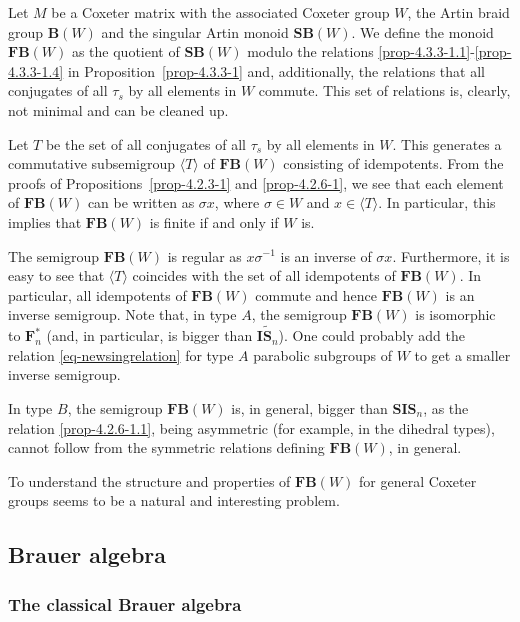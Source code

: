 \documentclass[a4paper]{amsart}
\begin{document}
Let $M$ be a Coxeter matrix with the associated Coxeter group $W$, 
the Artin braid group $\mathbf{B}(W)$ and the singular Artin monoid $\mathbf{SB}(W)$.
We define the monoid $\mathbf{FB}(W)$ as the quotient of $\mathbf{SB}(W)$
modulo the relations  \eqref{prop-4.3.3-1.1}-\eqref{prop-4.3.3-1.4} in
Proposition~\ref{prop-4.3.3-1}
and, additionally, the relations that all conjugates of all $\tau_s$ by
all elements in $W$ commute. This set of relations is, clearly, not minimal
and can be cleaned up.

Let $T$ be the set of all conjugates of all $\tau_s$ by all elements in $W$.
This generates a commutative subsemigroup $\langle T\rangle$ of 
$\mathbf{FB}(W)$ consisting of idempotents. From the proofs of 
Propositions~\ref{prop-4.2.3-1} and \ref{prop-4.2.6-1}, we see that 
each element of $\mathbf{FB}(W)$ can be written as $\sigma x$,
where $\sigma\in W$ and $x\in \langle T\rangle$. In particular, this
implies that $\mathbf{FB}(W)$ is finite if and only if $W$ is.

The semigroup $\mathbf{FB}(W)$ is regular as $x \sigma^{-1}$ is
an inverse of $\sigma x$. Furthermore, it is easy to see that
$\langle T\rangle$ coincides with the set of all idempotents of $\mathbf{FB}(W)$.
In particular, all idempotents of $\mathbf{FB}(W)$ commute and hence
$\mathbf{FB}(W)$ is an inverse semigroup. Note that, in type $A$, the semigroup
$\mathbf{FB}(W)$ is isomorphic to $\mathbf{F}^*_n$
(and, in particular, is bigger than $\widetilde{\mathbf{IS}_n}$).
One could probably add the relation \eqref{eq-newsingrelation} 
for type $A$ parabolic subgroups of $W$ to get a smaller 
inverse semigroup.

In type $B$, the semigroup $\mathbf{FB}(W)$
is, in general, bigger than ${\mathbf{SIS}}_n$, as the relation
\eqref{prop-4.2.6-1.1}, being asymmetric (for example, in the dihedral types), 
cannot follow from the symmetric relations defining $\mathbf{FB}(W)$, in general.

To understand the structure and properties of $\mathbf{FB}(W)$
for general Coxeter groups seems to be a natural and interesting problem.

\subsection{Brauer algebra}\label{s4.4}

\subsubsection{The classical Brauer algebra}\label{s4.4.1}
\end{document}
